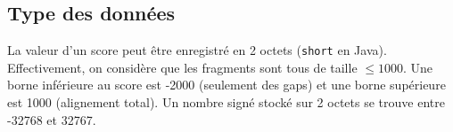 \subsection{Type des données} %
La valeur d'un score peut être enregistré en 2 octets (\texttt{short} en Java).
Effectivement, on considère que les fragments sont tous de taille $\le 1000$. %
Une borne inférieure au score est -2000 (seulement des gaps) %
et une borne supérieure est 1000 (alignement total).
Un nombre signé stocké sur 2 octets se trouve entre -32768 et 32767.
